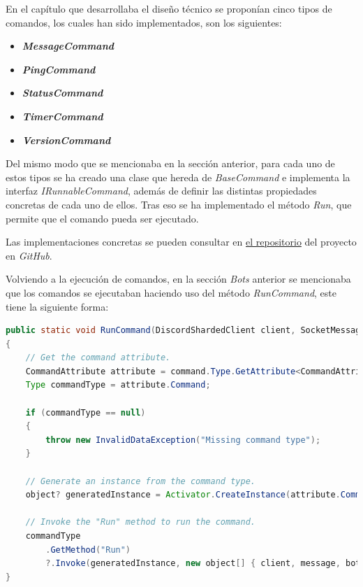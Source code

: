 En el capítulo que desarrollaba el diseño técnico se proponían cinco tipos de comandos, los cuales han sido implementados, son los siguientes:

\begin{itemize}
	\item \textbf{\textit{MessageCommand}}
	\item \textbf{\textit{PingCommand}}
	\item \textbf{\textit{StatusCommand}}
	\item \textbf{\textit{TimerCommand}}
	\item \textbf{\textit{VersionCommand}}
\end{itemize}

Del mismo modo que se mencionaba en la sección anterior, para cada uno de estos tipos se ha creado una clase que hereda de \textit{BaseCommand} e implementa la interfaz \textit{IRunnableCommand}, además de definir las distintas propiedades concretas de cada uno de ellos. Tras eso se ha implementado el método \textit{Run}, que permite que el comando pueda ser ejecutado.

Las implementaciones concretas se pueden consultar en \href{https://github.com/harvestcore/matroos/tree/develop/resources/src/Matroos.Resources/Classes/Commands/CustomCommands}{el repositorio} del proyecto en \textit{GitHub}.

Volviendo a la ejecución de comandos, en la sección \textit{Bots} anterior se mencionaba que los comandos se ejecutaban haciendo uso del método \textit{RunCommand}, este tiene la siguiente forma:

\begin{lstlisting}[language=java]
public static void RunCommand(DiscordShardedClient client, SocketMessage message, Bot bot, UserCommand command)
{
    // Get the command attribute.
    CommandAttribute attribute = command.Type.GetAttribute<CommandAttribute>();
    Type commandType = attribute.Command;

    if (commandType == null)
    {
        throw new InvalidDataException("Missing command type");
    }

    // Generate an instance from the command type.
    object? generatedInstance = Activator.CreateInstance(attribute.Command);

    // Invoke the "Run" method to run the command.
    commandType
        .GetMethod("Run")
        ?.Invoke(generatedInstance, new object[] { client, message, bot, command });
}
\end{lstlisting}

